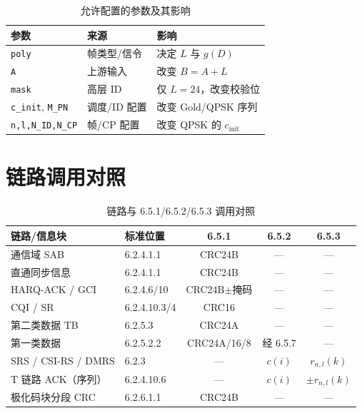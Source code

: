 \documentclass[11pt,a4paper]{ctexart}
\begin{document}
\begin{longtable}{L{4cm}L{4cm}L{6cm}}
\caption{允许配置的参数及其影响\label{tab:6513-tunable}} \\
\toprule
\textbf{参数} & \textbf{来源} & \textbf{影响} \\
\midrule
\texttt{poly} & 帧类型/信令 & 决定 $L$ 与 $g(D)$ \\
\texttt{A} & 上游输入 & 改变 $B{=}A{+}L$ \\
\texttt{mask} & 高层 ID & 仅 $L{=}24$，改变校验位 \\
\texttt{c\_init}, \texttt{M\_PN} & 调度/ID 配置 & 改变 Gold/QPSK 序列 \\
\texttt{n,l,N\_ID,N\_CP} & 帧/CP 配置 & 改变 QPSK 的 $c_{\mathrm{init}}$ \\
\bottomrule
\end{longtable}

\section{链路调用对照}

\begin{longtable}{L{4.2cm}L{2.8cm}ccc}
\caption{链路与 6.5.1/6.5.2/6.5.3 调用对照\label{tab:6513-link}} \\
\toprule
\textbf{链路/信息块} & \textbf{标准位置} & \textbf{6.5.1} & \textbf{6.5.2} & \textbf{6.5.3} \\
\midrule
通信域 SAB & 6.2.4.1.1 & CRC24B & --- & --- \\
直通同步信息 & 6.2.4.1.1 & CRC24B & --- & --- \\
HARQ-ACK / GCI & 6.2.4.6/10 & CRC24B$\pm$掩码 & --- & --- \\
CQI / SR & 6.2.4.10.3/4 & CRC16 & --- & --- \\
第二类数据 TB & 6.2.5.3 & CRC24A & --- & --- \\
第一类数据 & 6.2.5.2.2 & CRC24A/16/8 & 经 6.5.7 & --- \\
SRS / CSI-RS / DMRS & 6.2.3 & --- & $c(i)$ & $r_{n,l}(k)$ \\
T 链路 ACK（序列） & 6.2.4.10.6 & --- & $c(i)$ & $\pm r_{n,l}(k)$ \\
极化码块分段 CRC & 6.2.6.1.1 & CRC24B & --- & --- \\
\bottomrule
\end{longtable}

\end{document}
